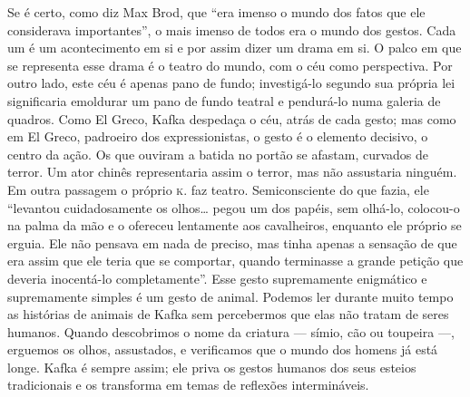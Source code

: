 Se é certo, como diz Max Brod, que ``era imenso o mundo dos fatos que
ele considerava importantes'', o mais imenso de todos era o mundo dos
gestos. Cada um é um acontecimento em si e por assim dizer um drama em
si. O palco em que se representa esse drama é o teatro do mundo, com o
céu como perspectiva. Por outro lado, este céu é apenas pano de fundo;
investigá-lo segundo sua própria lei significaria emoldurar um pano de
fundo teatral e pendurá-lo numa galeria de quadros. Como El Greco, Kafka
despedaça o céu, atrás de cada gesto; mas como em El Greco, padroeiro
dos expressionistas, o gesto é o elemento decisivo, o centro da ação. Os
que ouviram a batida no portão se afastam, curvados de terror. Um ator
chinês representaria assim o terror, mas não assustaria ninguém. Em
outra passagem o próprio \textsc{k.} faz teatro. Semiconsciente do que fazia, ele
``levantou cuidadosamente os olhos\ldots{} pegou um dos papéis, sem olhá-lo,
colocou-o na palma da mão e o ofereceu lentamente aos cavalheiros,
enquanto ele próprio se erguia. Ele não pensava em nada de preciso, mas
tinha apenas a sensação de que era assim que ele teria que se comportar,
quando terminasse a grande petição que deveria inocentá-lo
completamente''. Esse gesto supremamente enigmático e supremamente
simples é um gesto de animal. Podemos ler durante muito tempo as
histórias de animais de Kafka sem percebermos que elas não tratam de
seres humanos. Quando descobrimos o nome da criatura --- símio, cão ou
toupeira ---, erguemos os olhos, assustados, e verificamos que o mundo
dos homens já está longe. Kafka é sempre assim; ele priva os gestos
humanos dos seus esteios tradicionais e os transforma em temas de
reflexões intermináveis.

